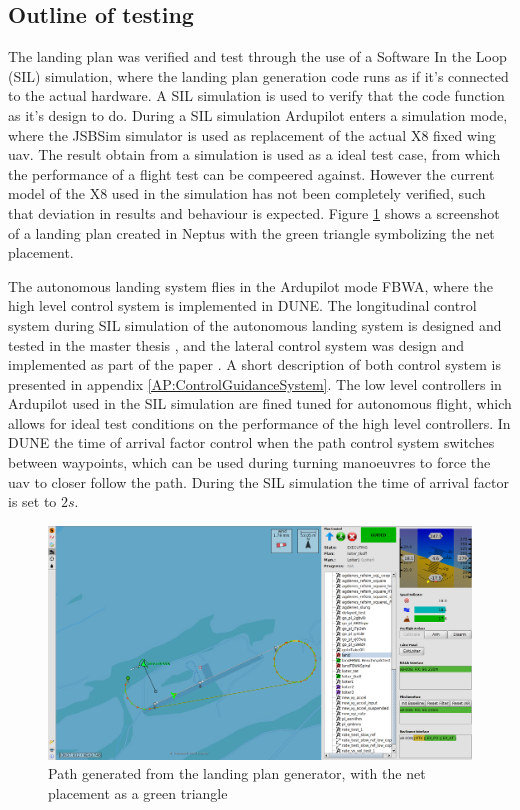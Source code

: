 \subsection{Outline of testing}\label{ss:SILOutline}
The landing plan was verified and test through the use of a Software In the Loop (SIL) simulation, where the landing plan generation code runs as if it's connected to the actual hardware. A SIL simulation is used to verify that the code function as it's design to do. During a SIL simulation Ardupilot enters a simulation mode, where the JSBSim simulator is used as replacement of the actual X8 fixed wing \gls{uav}. The result obtain from a simulation is used as a ideal test case, from which the performance of a flight test can be compeered against. However the current model of the X8 used in the simulation has not been completely verified, such that deviation in results and behaviour is expected. Figure \ref{Fig:LandingPathNeptus} shows a screenshot of a landing plan created in Neptus with the green triangle symbolizing the net placement.

The autonomous landing system flies in the Ardupilot mode FBWA, where the high level control system is implemented in DUNE. The longitudinal control system during SIL simulation of the autonomous landing system is designed and tested in the master thesis \citep{Sigurd}, and the lateral control system was design and implemented as part of the paper \citep{fortuna2015cascaded}. A short description of both control system is presented in appendix \ref{AP:ControlGuidanceSystem}. The low level controllers in Ardupilot used in the SIL simulation are fined tuned for autonomous flight, which allows for ideal test conditions on the performance of the high level controllers. In DUNE the time of arrival factor control when the path control system switches between waypoints, which can be used during turning manoeuvres to force the \gls{uav} to closer follow the path. During the SIL simulation the time of arrival factor is set to $2 s$.
\begin{figure}[H]
\centering
\includegraphics[scale=0.25]{figs/LandingPathNeptus.png}
\caption{Path generated from the landing plan generator, with the net placement as a green triangle}
\label{Fig:LandingPathNeptus}
\end{figure}
